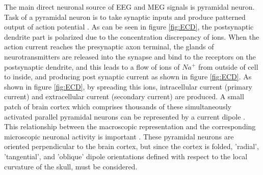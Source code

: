 The main direct neuronal source of EEG and MEG signals is pyramidal neuron.  
Task of a pyramidal neuron is to take synaptic inputs and produce patterned output of action potential \cite{Okada1993}.
As can be seen in figure \ref{fig:ECD}, the postsynaptic dendrite part is polarized due to the concentration discrepancy of ions.
When the action current reaches the presynaptic axon terminal, the glands of neurotransmitters are released into the synapse and bind to the receptors on the postsynaptic dendrite, and this leads to a flow of ions of $Na^+$ from outside of cell to inside, and producing post synaptic current as shown in figure \ref{fig:ECD}.
As shown in figure \ref{fig:ECD}, by spreading this ions, intracellular current (primary current) and extracellular current (secondary current)
 are produced.
A small patch of brain cortex which comprises thousands of these simultaneously activated parallel pyramidal neurons can be represented by a current dipole \cite{Cohen2003}.%
This relationship between the macroscopic representation and the corresponding microscopic neuronal activity is important \cite{Okada1997}.
These pyramidal neurons are oriented perpendicular to the brain cortex, but since the cortex is folded, 'radial', 'tangential', and 'oblique' dipole orientations defined with respect to the local curvature of the skull, must be considered. 

\FloatBarrier